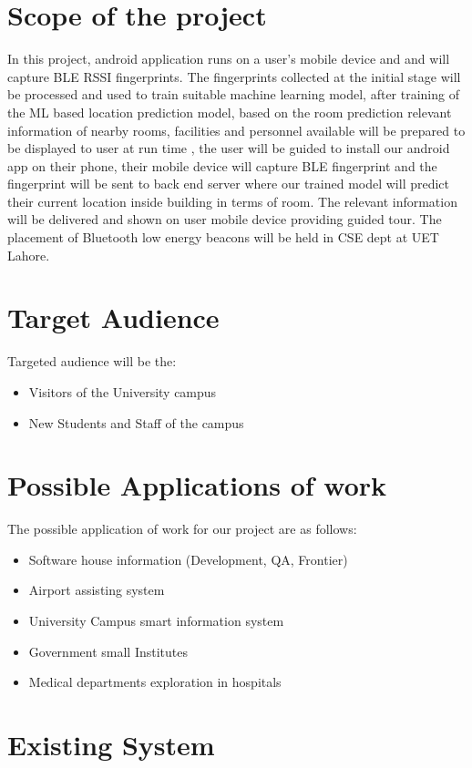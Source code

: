 \documentclass{article}
\begin{document}
\section{Scope of the project}
In this project, android application runs on a user’s mobile device and and will capture BLE RSSI fingerprints. The fingerprints collected at the initial stage will be processed and used to train suitable machine learning model, after training of the ML based location prediction model, based on the room prediction relevant information of nearby rooms, facilities and personnel available will be prepared to be displayed to user at run time , the user will be guided to install our android app on their phone, their mobile device will capture BLE fingerprint and the fingerprint will be sent to back end server where our trained model will predict their current location inside building in terms of room.\cite{lLoco} The relevant information will be delivered and shown on user mobile device providing guided tour. 
The placement of Bluetooth low energy beacons will be held in CSE dept at UET Lahore. 


\section{Target Audience}
Targeted audience will be the:
\begin{itemize}
\item Visitors of the University campus 
\item New Students and Staff of the campus
\end{itemize}



\section{Possible Applications of work}
The possible application of work for our project are as follows:


\begin{itemize}
\item Software house information (Development, QA, Frontier)
\item Airport assisting system
\item University Campus smart information system
\item Government small Institutes
\item Medical departments exploration in hospitals
\end{itemize}

\section{Existing System}
\end{document}
